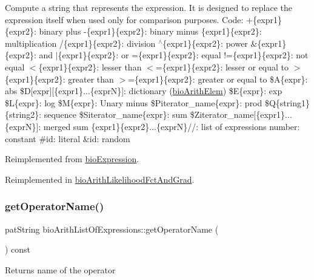 Compute a string that represents the expression. It is designed to replace the expression itself when used only for comparison purposes. Code\+: +\{expr1\}\{expr2\}\+: binary plus -\/\{expr1\}\{expr2\}\+: binary minus \{expr1\}\{expr2\}\+: multiplication /\{expr1\}\{expr2\}\+: division $^\wedge$\{expr1\}\{expr2\}\+: power \&\{expr1\}\{expr2\}\+: and $\vert$\{expr1\}\{expr2\}\+: or =\{expr1\}\{expr2\}\+: equal !=\{expr1\}\{expr2\}\+: not equal $<$\{expr1\}\{expr2\}\+: lesser than $<$=\{expr1\}\{expr2\}\+: lesser or equal to $>$\{expr1\}\{expr2\}\+: greater than $>$=\{expr1\}\{expr2\}\+: greater or equal to \$A\{expr\}\+: abs \$D\mbox{[}expr\mbox{]}\mbox{[}\{expr1\}...\{exprN\}\mbox{]}\+: dictionary (\hyperlink{classbio_arith_elem}{bio\+Arith\+Elem}) \$E\{expr\}\+: exp \$L\{expr\}\+: log \$M\{expr\}\+: Unary minus \$\+Piterator\+\_\+name\{expr\}\+: prod \$Q\{string1\}\{string2\}\+: sequence \$\+Siterator\+\_\+name\{expr\}\+: sum \$\+Ziterator\+\_\+name\mbox{[}\{expr1\}...\{exprN\}\mbox{]}\+: merged sum \{expr1\}\{expr2\}...\{exprN\}//\+: list of expressions number\+: constant \#id\+: literal \&id\+: random 

Reimplemented from \hyperlink{classbio_expression_a3e4b4dca58dbbc6f0e411b30eb3f60b4}{bio\+Expression}.



Reimplemented in \hyperlink{classbio_arith_likelihood_fct_and_grad_a5f34a72c24f6d3e7215e82b2b9843e19}{bio\+Arith\+Likelihood\+Fct\+And\+Grad}.

\mbox{\label{classbio_arith_list_of_expressions_af0c6e016d69454ac0b7d4f889190807e}} 
\subsubsection{\texorpdfstring{get\+Operator\+Name()}{getOperatorName()}}
{\footnotesize\ttfamily pat\+String bio\+Arith\+List\+Of\+Expressions\+::get\+Operator\+Name (\begin{DoxyParamCaption}{ }\end{DoxyParamCaption}) const\hspace{0.3cm}{\ttfamily [virtual]}}

\begin{DoxyReturn}{Returns}
name of the operator 
\end{DoxyReturn}


